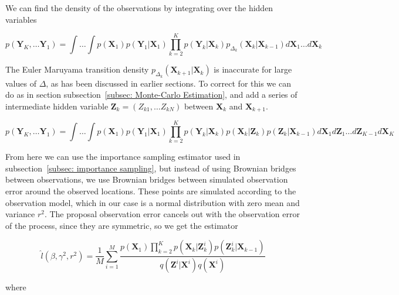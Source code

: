 We can find the density of the observations by integrating over the hidden variables

$$
p(\textbf{Y}_K, \dots \textbf{Y}_1) = \int \dots \int  p(\textbf{X}_1)p(\textbf{Y}_1|\textbf{X}_1)\prod_{k=2}^K p(\textbf{Y}_k |\textbf{X}_k)p_{\Delta_k}(\textbf{X}_k|\textbf{X}_{k-1}) d\textbf{X}_1 \dots d\textbf{X}_k
$$


The Euler Maruyama transition density $p_{\Delta_k}(\textbf{X}_{k+1}|\textbf{X}_k)$ is inaccurate for large values of $\Delta$, as has been discussed in earlier sections. To correct for this we can do as in section subsection~\ref{subsec: Monte-Carlo Estimation}, and add a series of intermediate hidden variable $\textbf{Z}_k = (Z_{k1}, \dots Z_{kN})$ between $\textbf{X}_k$ and $\textbf{X}_{k+1}$. 

$$
p(\textbf{Y}_K,\dots \textbf{Y}_1) = \int \dots \int  p(\textbf{X}_1)p(\textbf{Y}_1|\textbf{X}_1)\prod_{k=2}^K p(\textbf{Y}_k |\textbf{X}_k)p(\textbf{X}_k| \textbf{Z}_k)p(\textbf{Z}_k |\textbf{X}_{k-1}) d\textbf{X}_1d\textbf{Z}_1 \dots d\textbf{Z}_{K-1} d\textbf{X}_K 
$$

From here we can use the importance sampling estimator used in subsection~\ref{subsec: importance sampling}, but instead of using Brownian bridges between observations, we use Brownian bridges between simulated observation error around the observed locations. These points are simulated according to the observation model, which in our case is a normal distribution with zero mean and variance $r^2$. The proposal observation error cancels out with the observation error of the process, since they are symmetric, so we get the estimator

$$
\hat{l}(\beta, \gamma^2, r^2) =\frac{1}{M} \sum_{i = 1}^M  \frac{p(\textbf{X}_1)\prod_{k=2}^K p(\textbf{X}_k| \textbf{Z}_k^i)p(\textbf{Z}_k^i |\textbf{X}_{k-1})}{q(\textbf{Z}^i|\textbf{X}^i) q(\textbf{X}^i)}
$$

where $$


